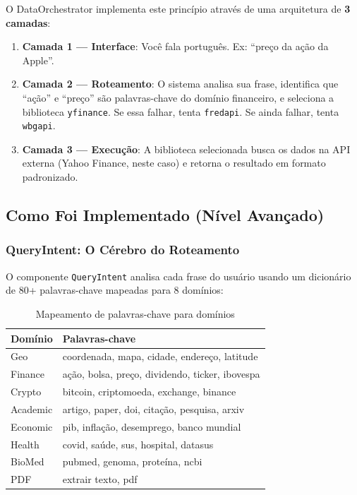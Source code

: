\documentclass[12pt,a4paper]{article}
\begin{document}
O DataOrchestrator implementa este princípio através de uma arquitetura de \textbf{3 camadas}:

\begin{enumerate}[itemsep=2pt]
  \item \textbf{Camada 1 --- Interface}: Você fala português. Ex: ``preço da ação da Apple''.
  \item \textbf{Camada 2 --- Roteamento}: O sistema analisa sua frase, identifica que ``ação'' e ``preço'' são palavras-chave do domínio financeiro, e seleciona a biblioteca \texttt{yfinance}. Se essa falhar, tenta \texttt{fredapi}. Se ainda falhar, tenta \texttt{wbgapi}.
  \item \textbf{Camada 3 --- Execução}: A biblioteca selecionada busca os dados na API externa (Yahoo Finance, neste caso) e retorna o resultado em formato padronizado.
\end{enumerate}

\subsection{Como Foi Implementado (Nível Avançado)}

\subsubsection{QueryIntent: O Cérebro do Roteamento}

O componente \texttt{QueryIntent} analisa cada frase do usuário usando um dicionário de 80+ palavras-chave mapeadas para 8 domínios:

\begin{table}[H]
  \centering
  \caption{Mapeamento de palavras-chave para domínios}
  \begin{tabular}{l l}
    \toprule
    \textbf{Domínio} & \textbf{Palavras-chave} \\
    \midrule
    Geo       & coordenada, mapa, cidade, endereço, latitude \\
    Finance   & ação, bolsa, preço, dividendo, ticker, ibovespa \\
    Crypto    & bitcoin, criptomoeda, exchange, binance \\
    Academic  & artigo, paper, doi, citação, pesquisa, arxiv \\
    Economic  & pib, inflação, desemprego, banco mundial \\
    Health    & covid, saúde, sus, hospital, datasus \\
    BioMed    & pubmed, genoma, proteína, ncbi \\
    PDF       & extrair texto, pdf \\
    \bottomrule
  \end{tabular}
\end{table}
\end{document}
